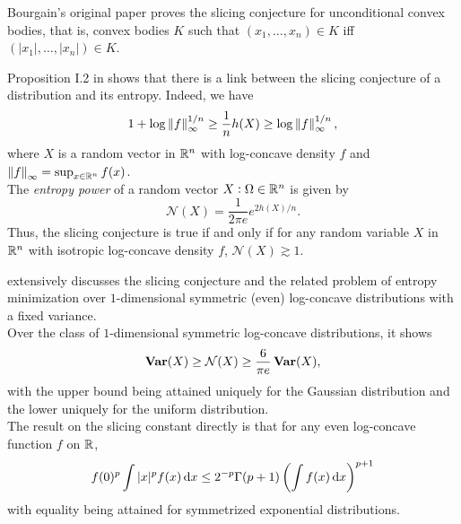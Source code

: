 \documentclass{article}
\begin{document}
	Bourgain's original paper \cite{bourgain-slicing} proves the slicing conjecture for unconditional convex bodies, that is, convex bodies $K$ such that $(x_1,\ldots,x_n) \in K$ iff $(|x_1|,\ldots,|x_n|) \in K$.

	Proposition I.2 in \cite{entropy-slicing} shows that there is a link between the slicing conjecture of a distribution and its entropy. Indeed, we have
	\begin{equation}
		1 + \log \left\lVert f\right\rVert_\infty^{1/n} \geq \frac{1}{n} h(X) \geq \log \left\lVert f\right\rVert_\infty^{1/n},
	\end{equation}
	where $X$ is a random vector in $\mathbb{R}^n$ with log-concave density $f$ and $\left\lVert f\right\rVert_\infty = \sup_{x \in \mathbb{R}^n} f(x)$.\\
	The \emph{entropy power} of a random vector $X : \Omega \in \mathbb{R}^n$ is given by
		\[ \mathcal{N}(X) = \frac{1}{2\pi e} e^{2h(X)/n}. \]
	Thus, the slicing conjecture is true if and only if for any random variable $X$ in $\mathbb{R}^n$ with isotropic log-concave density $f$, $\mathcal{N}(X) \gtrsim 1$.

	\cite{entropy-bound-1D-slicing} extensively discusses the slicing conjecture and the related problem of entropy minimization over $1$-dimensional symmetric (even) log-concave distributions with a fixed variance.\\
	Over the class of $1$-dimensional symmetric log-concave distributions, it shows
		\[ \operatorname{\textbf{Var}}(X) \ge \mathcal{N}(X) \geq \frac{6}{\pi e}\operatorname{\textbf{Var}}(X), \]
	with the upper bound being attained uniquely for the Gaussian distribution and the lower uniquely for the uniform distribution. \\
	The result on the slicing constant directly is that for any even log-concave function $f$ on $\mathbb{R}$,
		\[ f(0)^p \int |x|^p f(x) \dif x \le 2^{-p} \Gamma(p+1) \left( \int f(x) \dif x \right)^{p+1} \]
	with equality being attained for symmetrized exponential distributions.\\
\end{document}
